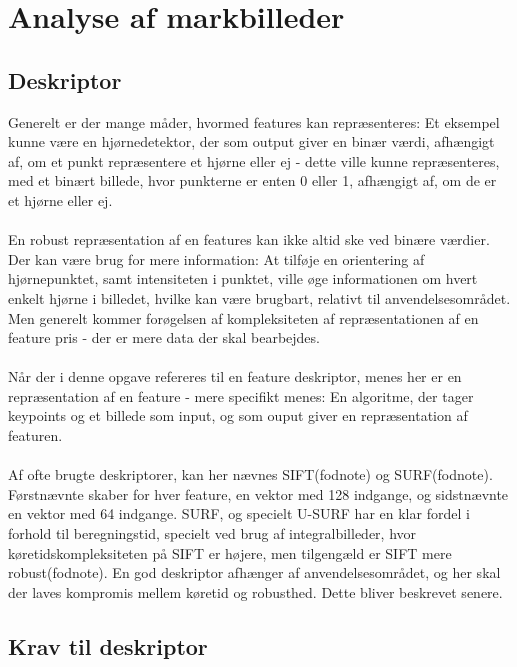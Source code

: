 \chapter{Analyse af markbilleder} \label{sec:mark}
\section{Deskriptor}
Generelt er der mange måder, hvormed features kan repræsenteres: Et eksempel kunne være en hjørnedetektor, der som output giver en binær værdi, afhængigt af, om et punkt repræsentere et hjørne eller ej - dette ville kunne repræsenteres, med et binært billede, hvor punkterne er enten 0 eller 1, afhængigt af, om de er et hjørne eller ej. 
\\ \\
En robust repræsentation af en features kan ikke altid ske ved binære værdier. Der kan være brug for mere information:  At tilføje en orientering af hjørnepunktet, samt intensiteten i punktet, ville øge informationen om hvert enkelt hjørne i billedet, hvilke kan være brugbart, relativt til anvendelsesområdet. Men generelt kommer forøgelsen af kompleksiteten af repræsentationen af en feature pris - der er mere data der skal bearbejdes. 
\\ \\
Når der i denne opgave refereres til en feature deskriptor, menes her er en repræsentation af en feature -  mere specifikt menes: En algoritme, der tager keypoints og et billede som input, og som ouput giver en repræsentation af featuren. 
\\ \\
Af ofte brugte deskriptorer, kan her nævnes SIFT(fodnote) og SURF(fodnote). Førstnævnte skaber for hver feature, en vektor med 128 indgange, og sidstnævnte en vektor med 64 indgange. SURF, og specielt U-SURF har en klar fordel i forhold til beregningstid, specielt ved brug af integralbilleder, hvor køretidskompleksiteten på SIFT er højere, men tilgengæld er SIFT mere robust(fodnote). En god deskriptor afhænger af anvendelsesområdet, og her skal der laves kompromis mellem køretid og robusthed. Dette bliver beskrevet senere.



\section{Krav til deskriptor}